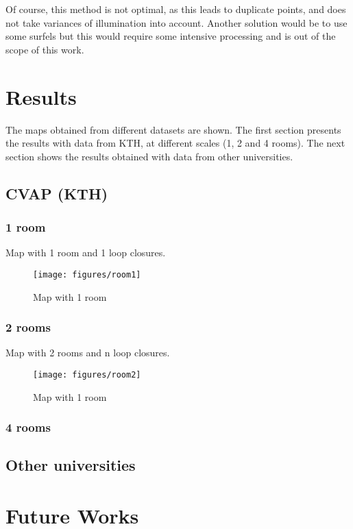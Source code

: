 \documentclass[a4paper,11pt]{kth-mag}
\begin{document}
Of course, this method is not optimal, as this leads to duplicate points, and does not take variances of illumination into account. Another solution would be to use some surfels \cite{IntelRGBD2010} but this would require some intensive processing and is out of the scope of this work.

\chapter{Results}

The maps obtained from different datasets are shown. The first section presents the results with data from KTH, at different scales (1, 2 and 4 rooms). The next section shows the results obtained with data from other universities.

\section{CVAP (KTH)}

\subsection{1 room}
Map with 1 room and 1 loop closures.
\begin{figure}[h]
\centering
\texttt{[image: figures/room1]}
\caption{Map with 1 room}
\end{figure}

\subsection{2 rooms}
Map with 2 rooms and n loop closures.
\begin{figure}[h]
\centering
\texttt{[image: figures/room2]}
\caption{Map with 1 room}
\end{figure}

\subsection{4 rooms}

\section{Other universities}

\chapter{Future Works}
\end{document}
